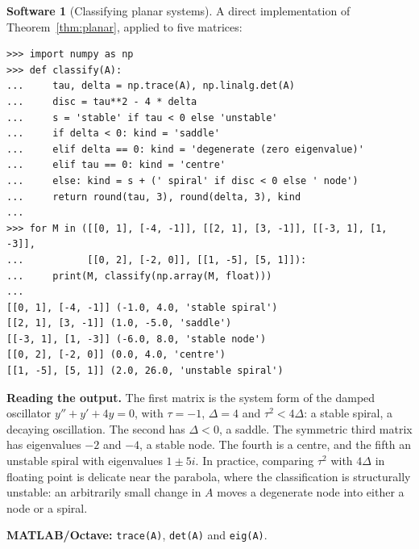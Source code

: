 \documentclass[11pt,a4paper]{article}
\numberwithin{equation}{section}
\theoremstyle{definition}
\newtheorem{software}[thm]{Software}
\begin{document}
\begin{software}[Classifying planar systems]
\label{sw:classify}
A direct implementation of Theorem~\ref{thm:planar}, applied to five matrices:
{\small\begin{verbatim}
>>> import numpy as np
>>> def classify(A):
...     tau, delta = np.trace(A), np.linalg.det(A)
...     disc = tau**2 - 4 * delta
...     s = 'stable' if tau < 0 else 'unstable'
...     if delta < 0: kind = 'saddle'
...     elif delta == 0: kind = 'degenerate (zero eigenvalue)'
...     elif tau == 0: kind = 'centre'
...     else: kind = s + (' spiral' if disc < 0 else ' node')
...     return round(tau, 3), round(delta, 3), kind
...
>>> for M in ([[0, 1], [-4, -1]], [[2, 1], [3, -1]], [[-3, 1], [1, -3]],
...           [[0, 2], [-2, 0]], [[1, -5], [5, 1]]):
...     print(M, classify(np.array(M, float)))
...
[[0, 1], [-4, -1]] (-1.0, 4.0, 'stable spiral')
[[2, 1], [3, -1]] (1.0, -5.0, 'saddle')
[[-3, 1], [1, -3]] (-6.0, 8.0, 'stable node')
[[0, 2], [-2, 0]] (0.0, 4.0, 'centre')
[[1, -5], [5, 1]] (2.0, 26.0, 'unstable spiral')
\end{verbatim}}
\textbf{Reading the output.} The first matrix is the system form of the damped oscillator $y'' + y' + 4y = 0$, with $\tau = -1$, $\Delta = 4$ and $\tau^2 < 4\Delta$: a stable spiral, a decaying oscillation. The
second has $\Delta < 0$, a saddle. The symmetric third matrix has eigenvalues $-2$ and $-4$, a stable node. The fourth is a centre, and the fifth an unstable spiral with eigenvalues $1 \pm 5i$.
In practice, comparing $\tau^2$ with $4\Delta$ in floating point is delicate near the parabola, where the classification is structurally unstable: an arbitrarily small change in
$A$ moves a degenerate node into either a node or a spiral.

\textbf{MATLAB/Octave:} \texttt{trace(A)}, \texttt{det(A)} and \texttt{eig(A)}.
\end{software}
\end{document}

